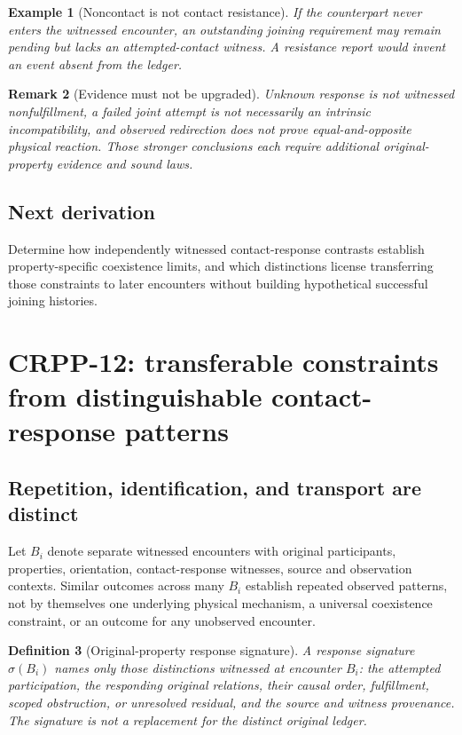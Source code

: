 \documentclass[11pt]{article}
\newtheorem{definition}{Definition}[section]
\newtheorem{remark}[definition]{Remark}
\newtheorem{example}[definition]{Example}
\begin{document}
\begin{example}[Noncontact is not contact resistance]
If the counterpart never enters the witnessed encounter,
an outstanding joining requirement may remain pending
but lacks an attempted-contact witness. A resistance
report would invent an event absent from the ledger.
\end{example}

\begin{remark}[Evidence must not be upgraded]
Unknown response is not witnessed nonfulfillment,
a failed joint attempt is not necessarily an
intrinsic incompatibility, and observed redirection
does not prove equal-and-opposite physical reaction.
Those stronger conclusions each require additional
original-property evidence and sound laws.
\end{remark}

\subsection{Next derivation}
Determine how independently witnessed contact-response
contrasts establish property-specific coexistence limits,
and which distinctions license transferring those
constraints to later encounters without building
hypothetical successful joining histories.


\section{CRPP-12: transferable constraints from distinguishable contact-response patterns}
\label{sec:crpp12}

\subsection{Repetition, identification, and transport are distinct}
Let $B_i$ denote separate witnessed encounters with original
participants, properties, orientation, contact-response witnesses,
source and observation contexts. Similar outcomes across many
$B_i$ establish repeated observed patterns, not by themselves
one underlying physical mechanism, a universal coexistence
constraint, or an outcome for any unobserved encounter.

\begin{definition}[Original-property response signature]
A response signature $\sigma(B_i)$ names only those distinctions
witnessed at encounter $B_i$: the attempted participation,
the responding original relations, their causal order,
fulfillment, scoped obstruction, or unresolved residual,
and the source and witness provenance. The signature
is not a replacement for the distinct original ledger.
\end{definition}
\end{document}
